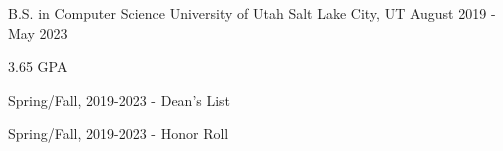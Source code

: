 


\begin{cventries}


\cventry
{B.S. in Computer Science} %
{University of Utah} %
{Salt Lake City, UT} %
{August 2019 - May 2023} %
{ %
\begin{cvitems}
\item {3.65 GPA}
\item {Spring/Fall, 2019-2023 - Dean's List}
\item {Spring/Fall, 2019-2023 - Honor Roll}
\end{cvitems}
}


\end{cventries}